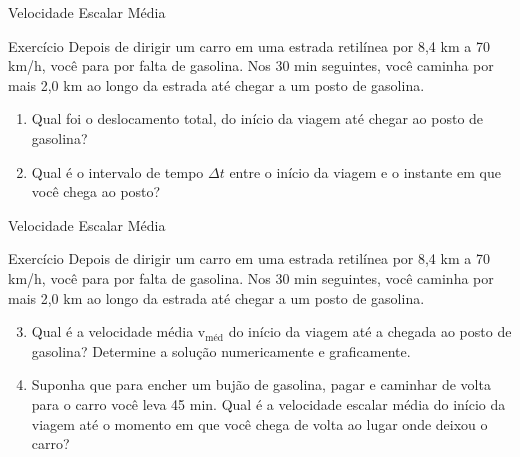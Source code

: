 \documentclass[xcolor=dvipsnames,table]{beamer}
\begin{document}
	\begin{frame}{Velocidade Escalar Média}
		\begin{block}{Exercício}
			Depois de dirigir um carro em uma estrada retilínea por	8,4 km a 70 km/h, você para por falta de gasolina. Nos 30 min seguintes, você caminha por mais 2,0 km ao longo da estrada até chegar a um posto de gasolina.
				\begin{enumerate} 
					\item Qual foi o deslocamento total, do início da viagem até chegar ao posto de gasolina?
					\item Qual é o intervalo de tempo $\Delta t$ entre o início da viagem e o instante em que você chega ao posto? 
				\end{enumerate}
			
		\end{block}
	\end{frame}

	\begin{frame}{Velocidade Escalar Média}
		\begin{block}{Exercício}
			Depois de dirigir um carro em uma estrada retilínea por	8,4 km a 70 km/h, você para por falta de gasolina. Nos 30 min seguintes, você caminha por mais 2,0 km ao longo da estrada até chegar a um posto de gasolina.
			\begin{enumerate}
				\setcounter{enumi}{2}
				\item Qual é a velocidade média v$_{\mbox{méd}}$ do início da viagem até a chegada ao posto de gasolina? Determine a solução numericamente e graficamente. 
				\item Suponha que para encher um bujão de gasolina, pagar e caminhar de volta para o carro você leva 45 min. Qual é a velocidade escalar média do início da viagem até o momento em que você chega de volta ao lugar onde deixou o carro?
			\end{enumerate}
		\end{block}
	\end{frame}
\end{document}
